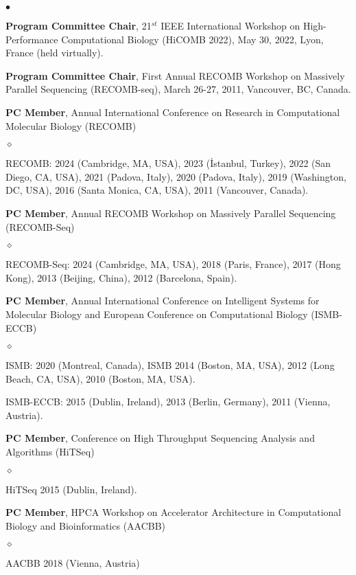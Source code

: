 \documentclass[margin,line]{res}
\newenvironment{list2}{
  \begin{list}{$\bullet$}{%
      \setlength{\itemsep}{0.1cm}
      \setlength{\parsep}{0in} \setlength{\parskip}{0in}
      \setlength{\topsep}{0in} \setlength{\partopsep}{0in} 
      \setlength{\leftmargin}{0.2in}}}{\end{list}}
\newenvironment{list3}{
  \begin{list}{$\diamond$}{%
      \setlength{\itemsep}{0in}
      \setlength{\parsep}{0.1cm} \setlength{\parskip}{0.1cm}
      \setlength{\topsep}{0.1cm} \setlength{\partopsep}{0.1cm} 
      \setlength{\leftmargin}{0.2in}}}{\end{list}}
\begin{document}
\begin{resume}
\begin{list2}
\item 
\textbf{Program Committee Chair}, 21$^{st}$ IEEE International Workshop on High-Performance Computational Biology (HiCOMB 2022), May 30, 2022, Lyon, France (held virtually).

\item
  \textbf{Program Committee Chair}, First Annual RECOMB Workshop on Massively Parallel Sequencing (RECOMB-seq), March 26-27, 2011, Vancouver, BC, Canada.
  
  \item
  \textbf{PC Member}, Annual International Conference on Research in Computational Molecular Biology (RECOMB)
  \begin{list3}
    \item RECOMB: 2024 (Cambridge, MA, USA), 2023 (İstanbul, Turkey), 2022 (San Diego, CA, USA),
     2021 (Padova, Italy), 2020 (Padova, Italy),  2019 (Washington, DC, USA),   2016 (Santa Monica, CA, USA),  2011 (Vancouver, Canada).
  \end{list3}
  
\item 
\textbf{PC Member},  Annual RECOMB Workshop on Massively Parallel Sequencing (RECOMB-Seq)
\begin{list3}
    \item RECOMB-Seq: 2024 (Cambridge, MA, USA), 2018 (Paris, France),  2017 (Hong Kong), 2013 (Beijing, China),  2012 (Barcelona, Spain).
\end{list3}


\item
  \textbf{PC Member}, Annual International Conference on Intelligent Systems for Molecular Biology and  European Conference on 
  Computational Biology  (ISMB-ECCB)
  \begin{list3}
  \item ISMB: 2020 (Montreal, Canada), ISMB 2014 (Boston, MA, USA), 2012 (Long Beach, CA, USA),  2010 (Boston, MA, USA).
  \item ISMB-ECCB: 2015 (Dublin, Ireland), 2013 (Berlin, Germany), 2011 (Vienna, Austria).
  \end{list3}

\item
  \textbf{PC Member}, Conference on High Throughput Sequencing Analysis and Algorithms (HiTSeq)
  \begin{list3}
      \item HiTSeq 2015 (Dublin, Ireland).
  \end{list3}


\item
  \textbf{PC Member}, 
HPCA Workshop on Accelerator Architecture in Computational Biology and Bioinformatics (AACBB)
\begin{list3}
    \item AACBB 2018 (Vienna, Austria)
\end{list3}


\end{list2}
\end{resume}
\end{document}

